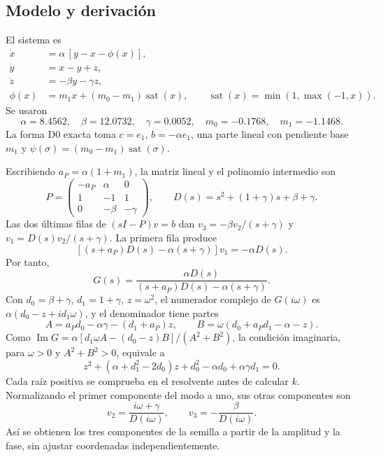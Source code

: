 \subsection{Modelo y derivación}

El sistema es
\begin{align}
 \dot x&=\alpha\,[y-x-\phi(x)],\nonumber\\
 \dot y&=x-y+z,\nonumber\\
 \dot z&=-\beta y-\gamma z, \label{int:eq:chua}\\
 \phi(x)&=m_1x+(m_0-m_1)\operatorname{sat}(x),\qquad
 \operatorname{sat}(x)=\min(1,\max(-1,x)).\nonumber
\end{align}
Se usaron
\[
 \alpha=8.4562,\quad \beta=12.0732,\quad \gamma=0.0052,\quad
 m_0=-0.1768,\quad m_1=-1.1468.
\]
La forma D0 exacta toma \(c=e_1\), \(b=-\alpha e_1\), una parte lineal
con pendiente base \(m_1\) y
\(\psi(\sigma)=(m_0-m_1)\operatorname{sat}(\sigma)\).

Escribiendo \(a_P=\alpha(1+m_1)\), la matriz lineal y el polinomio
intermedio son
\[
 P=\begin{pmatrix}-a_P&\alpha&0\\1&-1&1\\0&-\beta&-\gamma\end{pmatrix},
 \qquad D(s)=s^2+(1+\gamma)s+\beta+\gamma.
\]
Las dos últimas filas de \((sI-P)v=b\) dan
\(v_3=-\beta v_2/(s+\gamma)\) y
\(v_1=D(s)v_2/(s+\gamma)\). La primera fila produce
\[
 [(s+a_P)D(s)-\alpha(s+\gamma)]v_1=-\alpha D(s).
\]
Por tanto,
\begin{equation}
 G(s)=\frac{\alpha D(s)}{(s+a_P)D(s)-\alpha(s+\gamma)}.
 \label{int:eq:chua-transfer-derived}
\end{equation}
Con \(d_0=\beta+\gamma\), \(d_1=1+\gamma\), \(z=\omega^2\), el numerador
complejo de \(G(i\omega)\) es \(\alpha(d_0-z+id_1\omega)\), y el
denominador tiene partes
\[
 A=a_Pd_0-\alpha\gamma-(d_1+a_P)z,\qquad
 B=\omega(d_0+a_Pd_1-\alpha-z).
\]
Como \(\operatorname{Im}G=\alpha[d_1\omega A-(d_0-z)B]/(A^2+B^2)\),
la condición imaginaria, para \(\omega>0\) y \(A^2+B^2>0\), equivale a
\[
 z^2+(\alpha+d_1^2-2d_0)z+d_0^2-\alpha d_0+\alpha\gamma d_1=0.
\]
Cada raíz positiva se comprueba en el resolvente antes de calcular \(k\).
Normalizando el primer componente del modo a uno, sus otras componentes son
\[
 v_2=\frac{i\omega+\gamma}{D(i\omega)},\qquad
 v_3=-\frac{\beta}{D(i\omega)}.
\]
Así se obtienen los tres componentes de la semilla a partir de la amplitud y
la fase, sin ajustar coordenadas independientemente.

